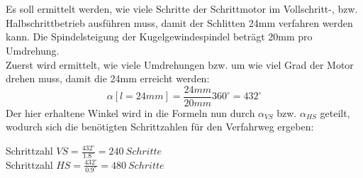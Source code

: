 \section{}\label{sec:4c}
Es soll ermittelt werden, wie viele Schritte der Schrittmotor im Vollschritt-, bzw. Halbschrittbetrieb ausführen muss, damit der Schlitten 24mm verfahren werden kann. Die Spindelsteigung der Kugelgewindespindel beträgt 20mm pro Umdrehung.\\
Zuerst wird ermittelt, wie viele Umdrehungen bzw. um wie viel Grad der Motor drehen muss, damit die 24mm erreicht werden:
\begin{equation}
\alpha[l = 24mm] = \frac{24mm}{20mm}360^{\circ} = 432^{\circ}
\label{eq:4c:grad}
\end{equation}
Der hier erhaltene Winkel wird in die Formeln nun durch $ \alpha_{VS} $ bzw. $ \alpha_{HS} $ geteilt, wodurch sich die benötigten Schrittzahlen für den Verfahrweg ergeben:
\begin{center}
	Schrittzahl $ VS = \frac{432^{\circ}}{1.8^{\circ}} = 240~Schritte $\\
	Schrittzahl $ HS = \frac{432^{\circ}}{0.9^{\circ}} = 480~Schritte$ 
\end{center}
